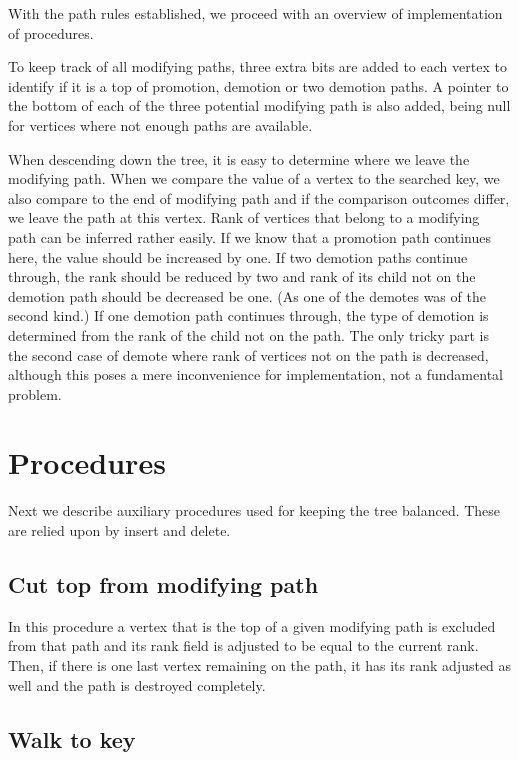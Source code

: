 With the path rules established, we proceed with an overview of implementation of procedures.

To keep track of all modifying paths, three extra bits are added to each vertex to identify if it is a top of promotion, demotion or two demotion paths. 
A pointer to the bottom of each of the three potential modifying path is also added, being null for vertices where not enough paths are available.

When descending down the tree, it is easy to determine where we leave the modifying path. 
When we compare the value of a vertex to the searched key, we also compare to the end of modifying path and if the comparison outcomes differ, we leave the path at this vertex. 
Rank of vertices that belong to a modifying path can be inferred rather easily. 
If we know that a promotion path continues here, the value should be increased by one. 
If two demotion paths continue through, the rank should be reduced by two and rank of its child not on the demotion path should be decreased be one. (As one of the demotes was of the second kind.)
If one demotion path continues through, the type of demotion is determined from the rank of the child not on the path. 
The only tricky part is the second case of demote where rank of vertices not on the path is decreased, although this poses a mere inconvenience for implementation, not a fundamental problem.

\section{Procedures}

Next we describe auxiliary procedures used for keeping the tree balanced. These are relied upon by insert and delete.

\subsection{Cut top from modifying path}

In this procedure a vertex that is the top of a given modifying path is excluded from that path and its rank field is adjusted to be equal to the current rank. Then, if there is one last vertex remaining on the path, it has its rank adjusted as well and the path is destroyed completely.

\subsection{Walk to key}


